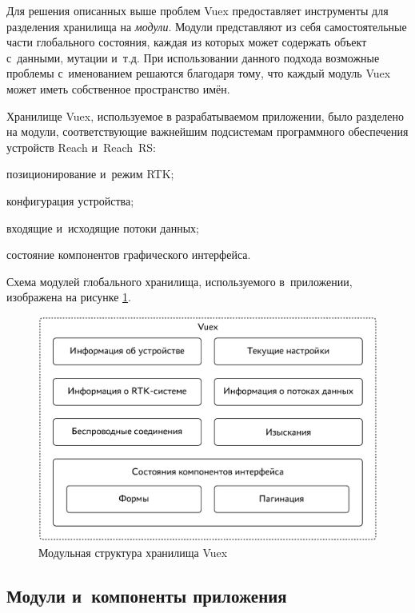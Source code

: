 Для решения описанных выше проблем Vuex предоставляет инструменты для разделения хранилища на \emph{модули}. Модули представляют из себя самостоятельные части глобального состояния, каждая из которых может содержать объект с~данными, мутации и~т.д. При использовании данного подхода возможные проблемы с~именованием решаются благодаря тому, что каждый модуль Vuex может иметь собственное пространство имён.


Хранилище Vuex, используемое в разрабатываемом приложении, было разделено на модули, соответствующие важнейшим подсистемам программного обеспечения устройств Reach и~Reach~RS:
\begin{dashitemize}
  \item позиционирование и~режим RTK;
  \item конфигурация устройства;
  \item входящие и~исходящие потоки данных;
  \item состояние компонентов графического интерфейса.
\end{dashitemize}

Схема модулей глобального хранилища, используемого в~приложении, изображена на рисунке \ref{fig:vuex-modules}.

\begin{figure}[h!]
  \centering
  \setlength{\fboxsep}{5pt}
  \includegraphics[width=.9\textwidth]{img/tikz/vuex-modules/pic}
  \vspace*{6pt}
  \caption{Модульная структура хранилища Vuex}\label{fig:vuex-modules}
\end{figure}



\subsection{Модули и~компоненты приложения}

